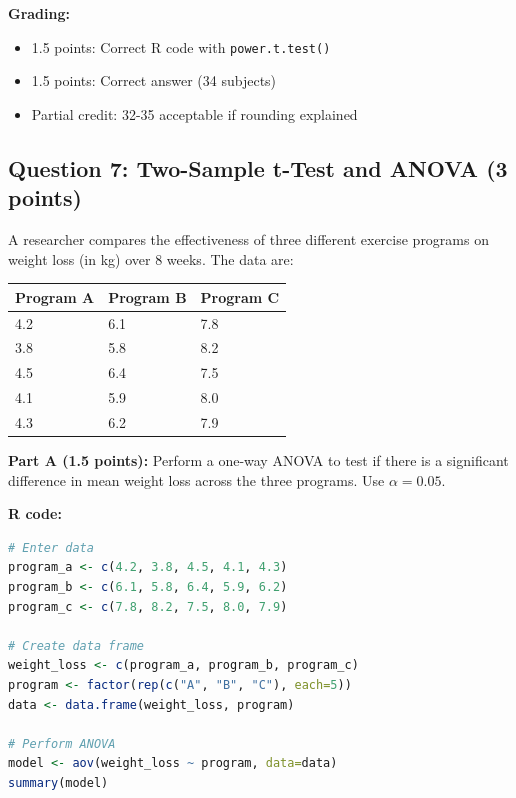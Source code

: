 \documentclass[11pt]{article}
\begin{document}
\textbf{Grading:}
\begin{itemize}
\item 1.5 points: Correct R code with \texttt{power.t.test()}
\item 1.5 points: Correct answer (34 subjects)
\item Partial credit: 32-35 acceptable if rounding explained
\end{itemize}

\vspace{1cm}

\subsection*{Question 7: Two-Sample t-Test and ANOVA (3 points)}

A researcher compares the effectiveness of three different exercise programs on weight loss (in kg) over 8 weeks. The data are:

\vspace{0.3cm}

\begin{center}
\begin{tabular}{lll}
\toprule
Program A & Program B & Program C \\
\midrule
4.2 & 6.1 & 7.8 \\
3.8 & 5.8 & 8.2 \\
4.5 & 6.4 & 7.5 \\
4.1 & 5.9 & 8.0 \\
4.3 & 6.2 & 7.9 \\
\bottomrule
\end{tabular}
\end{center}

\vspace{0.3cm}

\textbf{Part A (1.5 points):} Perform a one-way ANOVA to test if there is a significant difference in mean weight loss across the three programs. Use $\alpha = 0.05$.

\vspace{0.3cm}

\textbf{R code:}

\begin{lstlisting}[language=R,basicstyle=\small\ttfamily,frame=single]
# Enter data
program_a <- c(4.2, 3.8, 4.5, 4.1, 4.3)
program_b <- c(6.1, 5.8, 6.4, 5.9, 6.2)
program_c <- c(7.8, 8.2, 7.5, 8.0, 7.9)

# Create data frame
weight_loss <- c(program_a, program_b, program_c)
program <- factor(rep(c("A", "B", "C"), each=5))
data <- data.frame(weight_loss, program)

# Perform ANOVA
model <- aov(weight_loss ~ program, data=data)
summary(model)
\end{lstlisting}
\end{document}

